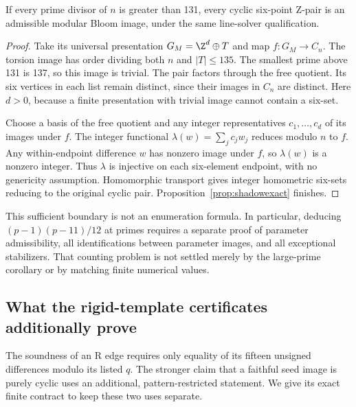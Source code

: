 \begin{corollary}\label{cor:largeprime}
If every prime divisor of $n$ is greater than 131, every cyclic six-point
Z-pair is an admissible modular Bloom image, under the same line-solver
qualification.
\end{corollary}
\begin{proof}
Take its universal presentation $G_M=\Z^d\oplus T$ and map
$f\colon G_M\to C_n$. The torsion image has order dividing both $n$
and $|T|\le135$. The smallest prime above 131 is 137, so this image
is trivial. The pair factors through the free quotient. Its six vertices
in each list remain distinct, since their images in $C_n$ are distinct.
Here $d>0$, because a finite presentation with trivial image cannot
contain a six-set.

Choose a basis of the free quotient and any integer representatives
$c_1,\ldots,c_d$ of its images under $f$. The integer functional
$\lambda(w)=\sum_j c_jw_j$ reduces modulo $n$ to $f$. Any within-endpoint
difference $w$ has nonzero image under $f$, so $\lambda(w)$ is a nonzero
integer. Thus $\lambda$ is injective on each six-element endpoint, with
no genericity assumption. Homomorphic transport gives integer homometric
six-sets reducing to the original cyclic pair.
Proposition~\ref{prop:shadowexact} finishes.
\end{proof}

This sufficient boundary is not an enumeration formula. In particular,
deducing $(p-1)(p-11)/12$ at primes requires a separate proof of parameter
admissibility, all identifications between parameter images, and all
exceptional stabilizers. That counting problem is not settled merely by
the large-prime corollary or by matching finite numerical values.

\subsection{What the rigid-template certificates additionally prove}
The soundness of an R edge requires only equality of its fifteen unsigned
differences modulo its listed $q$. The stronger claim that a faithful seed
image is purely cyclic uses an additional, pattern-restricted statement.
We give its exact finite contract to keep these two uses separate.

